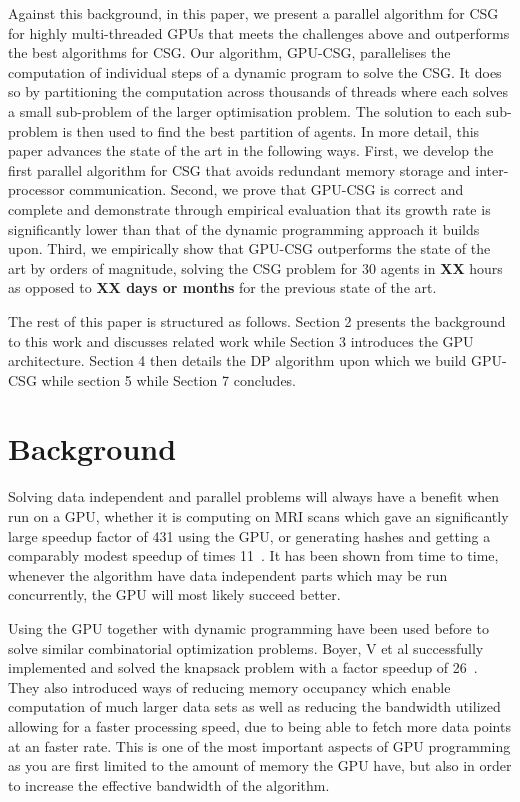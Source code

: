 \documentclass{llncs}
\begin{document}
Against this background, in this paper, we present a parallel algorithm for CSG for highly multi-threaded GPUs that meets the challenges above and outperforms the best algorithms for CSG. Our algorithm, GPU-CSG, parallelises the computation of individual steps of a dynamic program to solve the CSG. It does so by partitioning the computation across thousands of threads where each solves a small sub-problem of the larger optimisation problem. The solution to each sub-problem is then used to find the best partition of agents. In more detail, this paper advances the state of the art in the following ways. First, we develop the first parallel  algorithm for CSG that avoids redundant memory storage and inter-processor communication. Second, we prove that GPU-CSG is correct and complete and demonstrate through empirical evaluation that its growth rate is significantly lower than that of the dynamic programming approach it builds upon. Third, we empirically show that GPU-CSG outperforms the state of the art by orders of magnitude, solving the CSG problem for 30 agents in \textbf{XX} hours as opposed to \textbf{XX days or months} for the previous state of the art.

The rest of this paper is structured as follows. Section 2 presents the
background to this work and discusses related work while Section 3 introduces
the GPU architecture. Section 4 then details the DP algorithm upon which we build GPU-CSG
while section 5 while Section 7 concludes.

\section{Background}
Solving data independent and parallel problems will always have a benefit when run on a GPU, 
whether it is computing on MRI scans which gave an significantly large speedup factor of 431 using the GPU, or generating hashes and getting a comparably modest speedup of times 11~\cite{ryoo2008optimization}. 
It has been shown from time to time, whenever the algorithm have data independent parts which may be run concurrently,
the GPU will most likely succeed better.

Using the GPU together with dynamic programming have been used before to solve similar combinatorial optimization problems. 
Boyer, V et al successfully implemented and solved the knapsack problem with a factor speedup of 26~\cite{boyer2012solving}. 
They also introduced ways of reducing memory occupancy which enable computation of much larger data sets as well as reducing the 
bandwidth utilized allowing for a faster processing speed, due to being able to fetch more data points at an faster rate. 
This is one of the most important aspects of GPU programming as you are first limited to the amount of memory the GPU have, 
but also in order to increase the effective bandwidth of the algorithm.
\end{document}
